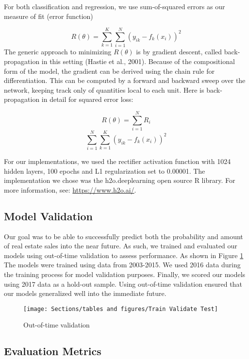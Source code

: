 \documentclass[12pt,]{article}
\begin{document}
For both classification and regression, we use sum-of-squared errors as
our measure of fit (error function)

\[
R(\theta)=\sum_{k=1}^K\sum_{i=1}^N(y_{ik}-f_{k}(x_i))^2
\] The generic approach to minimizing \(R(\theta)\) is by gradient
descent, called back-propagation in this setting (Hastie et al., 2001).
Because of the compositional form of the model, the gradient can be
derived using the chain rule for differentiation. This can be computed
by a forward and backward sweep over the network, keeping track only of
quantities local to each unit. Here is back-propagation in detail for
squared error loss:

\[
R(\theta) = \sum_{i=1}^NR_i
\] \[
\sum_{i=1}^N\sum_{k=1}^K(y_{ik}-f_{k}(x_i))^2
\]

For our implementations, we used the rectifier activation function with
1024 hidden layers, 100 epochs and L1 regularization set to 0.00001. The
implementation we chose was the h2o.deeplearning open source R library.
For more information, see: \url{https://www.h2o.ai/}.

\hypertarget{model-validation}{%
\subsection{Model Validation}\label{model-validation}}

Our goal was to be able to successfully predict both the probability and
amount of real estate sales into the near future. As such, we trained
and evaluated our models using out-of-time validation to assess
performance. As shown in Figure \ref{fig:Train Test Validate} The models
were trained using data from 2003-2015. We used 2016 data during the
training process for model validation purposes. Finally, we scored our
models using 2017 data as a hold-out sample. Using out-of-time
validation ensured that our models generalized well into the immediate
future.

\begin{figure}[H]
\texttt{[image: Sections/tables and figures/Train Validate Test]} \caption{Out-of-time validation}\label{fig:Train Test Validate}
\end{figure}

\hypertarget{evaluation-metrics}{%
\subsection{Evaluation Metrics}\label{evaluation-metrics}}
\end{document}
